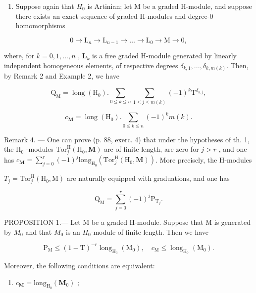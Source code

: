 \begin{enumerate}
\def\labelenumi{\arabic{enumi})}
\setcounter{enumi}{2}
\tightlist
\item
  Suppose again that \(H_{0}\) is Artinian; let M be a graded H-module, and suppose there exists an exact sequence of graded H-modules and degree-0 homomorphisms
\end{enumerate}

\[
0 \to \mathrm{L} _ {n} \to \mathrm{L} _ {n - 1} \to \dots \to \mathrm{L} _ {0} \to \mathrm{M} \to 0,
\]

where, for \(k=0,1,...,n\) , \(\mathbf{L}_{k}\) is a free graded H-module generated by linearly independent homogeneous elements, of respective degrees \(\delta_{k,1},..., \delta_{k,m(k)}\). Then, by Remark 2 and Example 2, we have

\[
\mathrm{Q} _ {\mathrm{M}} = \operatorname{long} (\mathrm{H} _ {0}). \sum_ {0 \leqslant k \leqslant n} \sum_ {1 \leqslant j \leqslant m (k)} (- 1) ^ {k} \mathrm{T} ^ {\delta_ {k, j}},
\]

\[
c _ {\mathbf {M}} = \operatorname{long} (\mathrm{H} _ {0}). \sum_ {0 \leqslant k \leqslant n} (- 1) ^ {k} m (k).
\]

Remark 4. --- One can prove (p. 88, exerc. 4) that under the hypotheses of th. 1, the \(\mathrm{H}_{0}\) -modules \(\mathrm{Tor}_{j}^{\mathrm{H}}(\mathrm{H}_{0},\mathbf{M})\) are of finite length, are zero for \(j > r\) , and one has \(c_{\mathbf{M}} = \sum_{j=0}^{r} (-1)^{j} \mathrm{long}_{\mathrm{H}_{0}}(\mathrm{Tor}_{j}^{\mathrm{H}}(\mathrm{H}_{0},\mathbf{M}))\). More precisely, the H-modules

\(T_{j} = \text{Tor}_{j}^{\text{H}}(\text{H}_{0}, \text{M})\) are naturally equipped with graduations, and one has

\[
\mathrm{Q} _ {\mathrm{M}} = \sum_ {j = 0} ^ {r} (- 1) ^ {j} \mathrm{P} _ {\mathrm{T} _ {j}}.
\]

PROPOSITION 1.--- Let M be a graded H-module. Suppose that M is generated by \(M_{0}\) and that \(M_{0}\) is an \(H_{0}\)-module of finite length. Then we have

\[
\mathrm{P} _ {\mathrm{M}} \leqslant (1 - \mathrm{T}) ^ {- r} \operatorname{long} _ {\mathrm{H} _ {0}} (\mathrm{M} _ {0}), \quad c _ {\mathrm{M}} \leqslant \operatorname{long} _ {\mathrm{H} _ {0}} (\mathrm{M} _ {0}).
\]

Moreover, the following conditions are equivalent:

\begin{enumerate}
\def\labelenumi{(\roman{enumi})}
\tightlist
\item
  \(c_{\mathbf{M}} = \mathrm{long}_{\mathrm{H_0}}(\mathbf{M}_0)\) ;
\end{enumerate}

